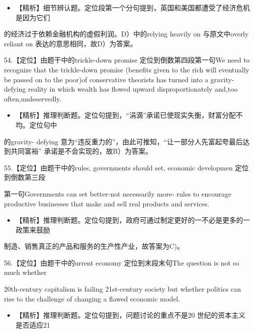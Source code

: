 \documentclass[UTF8,11pt]{ctexart}
\begin{document}
\begin{itemize}[leftmargin=2em,itemsep=.2em,topsep=.4em]\item[D.] 【精析】细节辨认题。定位段第一个分句提到，英国和美国都遭受了经济危机是因为它们
\end{itemize}

的经济过于依赖金融机构的虚假利润。D）中的relying heavily on 与原文中overly reliant on 表达的意思相同，故D）为答案。


54.【定位】由题干中的trickle-down promise 定位到倒数第四段第一句We need to recognize that the trickle-down promise (benefits given to the rich will eventually be passed on to the poor)of conservative theorists has turned into a gravity-defying reality in which wealth has flowed upward disproportionately and,too often,undeservedly.


\begin{itemize}[leftmargin=2em,itemsep=.2em,topsep=.4em]\item[B.] 【精析】推理判断题。定位句提到，“涓滴”承诺已使现实失衡，财富分配不均。定位句中
\end{itemize}

的gravity- defying 意为“违反重力的”，由此可推知，“让一部分人先富起夸最后达到共同富裕” 承诺是不会实现的，故B）为答案。


55.【定位】由题干中的rules, governments should set, economic developmen 定位到倒数第三段


第一句Governments can set better-not necessarily more- rules to encourage productive businesses that make and sell real products and services.


\begin{itemize}[leftmargin=2em,itemsep=.2em,topsep=.4em]\item[C.] 【精析】推理判断题。定位句提到，政府可通过制定更好的一不必是更多的一政策来鼓励
\end{itemize}

制造、销售真正的产品和服务的生产性产业，故答案为C)。


56.【定位】由题干中的urrent economy 定位到末段末句The question is not so much whether


20th-century capitalism is failing 21st-century society but whether politics can rise to the challenge of changing a flawed economic model.


\begin{itemize}[leftmargin=2em,itemsep=.2em,topsep=.4em]\item[B.] 【精析】推理判断题。定位句提到，问题讨论的重点不是20 世纪的资本主义是否适应21
\end{itemize}
\end{document}
